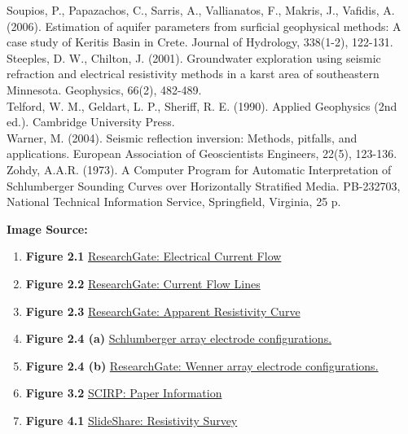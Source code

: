 \documentclass[12pt,a4paper]{report}
\begin{document}
\begin{justify}
    Soupios, P., Papazachos, C., Sarris, A., Vallianatos, F., Makris, J., Vafidis, A. (2006). Estimation of aquifer parameters from surficial geophysical methods: A case study of Keritis Basin in Crete. Journal of Hydrology, 338(1-2), 122-131. \\
    
    Steeples, D. W., Chilton, J. (2001). Groundwater exploration using seismic refraction and electrical resistivity methods in a karst area of southeastern Minnesota. Geophysics, 66(2), 482-489. \\
    
    Telford, W. M., Geldart, L. P., Sheriff, R. E. (1990). Applied Geophysics (2nd ed.). Cambridge University Press. \\
    
    Warner, M. (2004). Seismic reflection inversion: Methods, pitfalls, and applications. European Association of Geoscientists Engineers, 22(5), 123-136. \\

    Zohdy, A.A.R. (1973). A Computer Program for Automatic Interpretation of Schlumberger Sounding Curves over Horizontally Stratified Media. PB-232703, National Technical Information Service, Springfield, Virginia, 25 p. \\
\end{justify}

\textbf{Image Source:} \\

\begin{enumerate}  
    \item \textbf{Figure 2.1} \href{https://www.researchgate.net/figure/Diagram-illustrating-electrical-current-flow-through-the-subsurface-using-the-Wenner_fig6_372649419}{ResearchGate: Electrical Current Flow}
    \item \textbf{Figure 2.2} \href{https://www.researchgate.net/figure/Simplified-current-flow-lines-and-equipotential-surfaces-arising-from-a-a-single_fig1_323353321}{ResearchGate: Current Flow Lines}
    \item \textbf{Figure 2.3} \href{https://www.researchgate.net/figure/Apparent-resistivity-curve-for-a-two-layer-model_fig3_336309181}{ResearchGate: Apparent Resistivity Curve}
    \item \textbf{Figure 2.4 (a)} \href{https://www.researchgate.net/figure/Schematic-diagram-of-the-schlumberger-array-used-in-the-survey_fig3_332030886https://www.researchgate.net/figure/Schematic-diagram-of-the-schlumberger-array-used-in-the-survey_fig3_332030886}{Schlumberger array electrode configurations.}
    \item \textbf{Figure 2.4 (b)} \href{https://www.researchgate.net/figure/Wenner-array-a-is-electrode-spacing-and-distribution-of-electric-field-underneath_fig1_238505598}{ResearchGate: Wenner array electrode configurations.}
    \item \textbf{Figure 3.2} \href{https://www.scirp.org/journal/paperinformation?paperid=8137}{SCIRP: Paper Information}
    \item \textbf{Figure 4.1} \href{https://www.slideshare.net/slideshow/resistivity-survey/91069642}{SlideShare: Resistivity Survey}
\end{enumerate}
\end{document}
